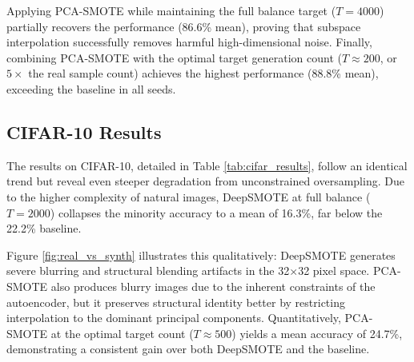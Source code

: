 \documentclass[conference]{IEEEtran}
\begin{document}
Applying PCA-SMOTE while maintaining the full balance target ($T=4000$) partially recovers the performance (86.6\% mean), proving that subspace interpolation successfully removes harmful high-dimensional noise. Finally, combining PCA-SMOTE with the optimal target generation count ($T \approx 200$, or $5\times$ the real sample count) achieves the highest performance (88.8\% mean), exceeding the baseline in all seeds.

\begin{table}[t]
    \centering
    \caption{MNIST minority class (Digit 9) accuracy (\%) across three random seeds.}
    \label{tab:mnist_results}
\end{table}

\subsection{CIFAR-10 Results}
\label{subsec:cifar}
The results on CIFAR-10, detailed in Table \ref{tab:cifar_results}, follow an identical trend but reveal even steeper degradation from unconstrained oversampling. Due to the higher complexity of natural images, DeepSMOTE at full balance ($T=2000$) collapses the minority accuracy to a mean of 16.3\%, far below the 22.2\% baseline. 

Figure \ref{fig:real_vs_synth} illustrates this qualitatively: DeepSMOTE generates severe blurring and structural blending artifacts in the 32$\times$32 pixel space. PCA-SMOTE also produces blurry images due to the inherent constraints of the autoencoder, but it preserves structural identity better by restricting interpolation to the dominant principal components. Quantitatively, PCA-SMOTE at the optimal target count ($T \approx 500$) yields a mean accuracy of 24.7\%, demonstrating a consistent gain over both DeepSMOTE and the baseline.
\end{document}
